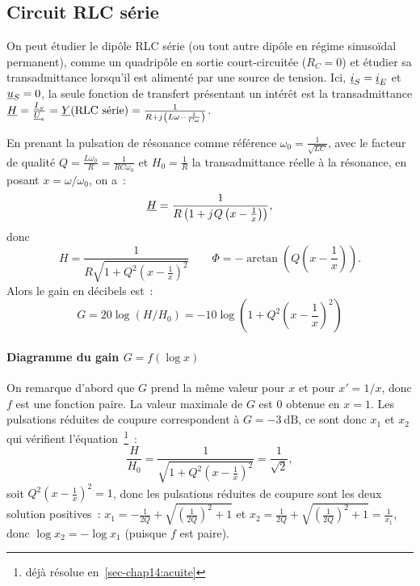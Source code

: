 \subsection{Circuit RLC série}%
On peut étudier le dipôle RLC série (ou tout autre dipôle en régime sinusoïdal 
permanent), comme un quadripôle en sortie court-circuitée (\(R_C = 0\)) et 
étudier sa transadmittance lorsqu'il est alimenté par une source de tension.
Ici, \(\underline{i}_S = \underline{i}_E\) et \(\underline{u}_S = 0\), la seule fonction de transfert 
présentant un intérêt est la transadmittance \(\underline{H} = \frac{\underline{I}_S}{\underline{U}_e} = 
\underline{Y}(\text{RLC série}) = \frac{1}{R + {j\mkern1mu}\left(L\omega 
-\frac{1}{C\omega}\right)}\).

En prenant la pulsation de résonance comme référence \(\omega_0 = 
\frac{1}{\sqrt{LC}}\), avec le facteur de qualité \(Q = \frac{L\omega_0}{R} = 
\frac{1}{RC\omega_0}\) et \(H_0 = \frac{1}{R}\) la transadmittance réelle à la 
résonance, en posant \(x = \omega / \omega_0\), on a~:
\begin{equation}%
\Hc = \frac{1}{R\left(1+\ju Q\left(x-\frac{1}{x}\right)\right)},
\end{equation}%
donc
\begin{equation}%
H = \frac{1}{R\sqrt{1+Q^2\left(x-\frac{1}{x}\right)^2}} \qquad \Phi = 
	-\arctan\left(Q \left(x-\frac{1}{x} \right) \right).
\end{equation}%
Alors le gain en décibels est~:
\begin{equation}%
G = 20\log(H/H_0) = -10\log\left( 1 + Q^2\left(x-\frac{1}{x} \right)^2\right)
\end{equation}%

\paragraph{Diagramme du gain \(G = f(\log x)\)}%

On remarque d'abord que \(G\) prend la même valeur pour \(x\) et pour \(x' = 
1/x\), donc \(f\) est une fonction paire. La valeur maximale de \(G\) est \(0\) 
obtenue en \(x=1\). Les pulsations réduites de coupure correspondent à \(G = 
\SI{-3}{\dB}\), ce sont donc \(x_1\) et \(x_2\) qui vérifient
l'équation~\footnote{déjà résolue en~\ref{sec-chap14:acuite}}~:
\begin{equation}%
\frac{H}{H_0} = \frac{1}{\sqrt{1+Q^2\left(x-\frac{1}{x} \right)^2}} = 
	\frac{1}{\sqrt{2}},%
\end{equation}%
soit \(Q^2\left(x-\frac{1}{x} \right)^2=1\), donc les pulsations réduites de 
coupure sont les deux solution positives~: \(x_1 = -\frac{1}{2Q} + 
\sqrt{\left(\frac{1}{2Q} \right)^2+1}\) et \(x_2 = \frac{1}{2Q} + 
\sqrt{\left(\frac{1}{2Q} \right)^2+1} = \frac{1}{x_1}\), donc \(\log x_2 = 
-\log x_1\) (puisque \(f\) est paire).

